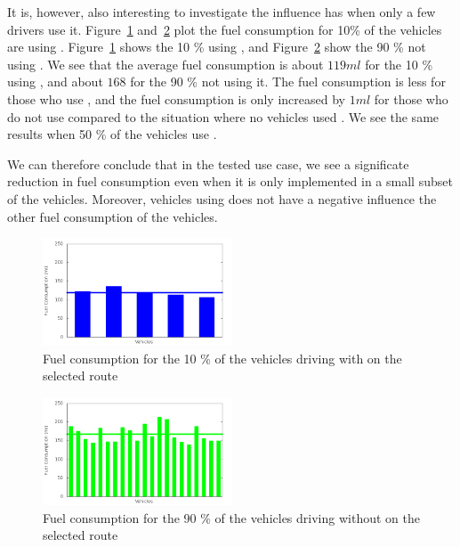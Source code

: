 It is, however, also interesting to investigate the influence \tech has when only a few drivers use it.
Figure~\ref{fig:TestResults:fuelControlled10} and~\ref{fig:TestResults:fuelUncontrolled10} plot the fuel consumption for 10\% of the vehicles are using \tech.
Figure~\ref{fig:TestResults:fuelControlled10} shows the 10 \% using \tech, and Figure~\ref{fig:TestResults:fuelUncontrolled10} show the 90 \% not using \tech.
We see that the average fuel consumption is about $119 ml$ for the 10 \% using \tech, and about $168$ for the 90 \% not using it.
The fuel consumption is less for those who use \tech, and the fuel consumption is only increased by $1 ml$ for those who do not use \tech compared to the situation where no vehicles used \tech.
We see the same results when 50 \% of the vehicles use \tech.

We can therefore conclude that in the tested use case, we see a significate reduction in fuel consumption even when it is only implemented in a small subset of the vehicles. 
Moreover, vehicles using \tech does not have a negative influence the other fuel consumption of the vehicles.

\begin{figure}[h]
\includegraphics[width=0.5\textwidth]{images/tp0/fuelRouteControlled10.png}
\caption{Fuel consumption for the 10 \% of the vehicles driving with \tech on the selected route}
\label{fig:TestResults:fuelControlled10}
\end{figure}
\begin{figure}[h]
\includegraphics[width=0.5\textwidth]{images/tp0/fuelRouteUncontrolled10.png}
\caption{Fuel consumption for the 90 \% of the vehicles driving without \tech on the selected route}
\label{fig:TestResults:fuelUncontrolled10}
\end{figure}

